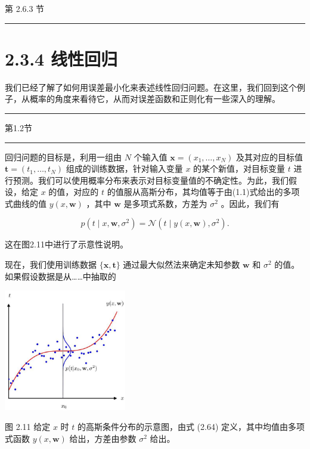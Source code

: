\documentclass[10pt]{report}
\newcommand{\HRule}{\begin{center}\rule{0.9\linewidth}{0.2mm}\end{center}}
\begin{document}
第 2.6.3 节

\HRule

\section*{2.3.4 线性回归}

我们已经了解了如何用误差最小化来表述线性回归问题。在这里，我们回到这个例子，从概率的角度来看待它，从而对误差函数和正则化有一些深入的理解。

\HRule

第1.2节

\HRule

回归问题的目标是，利用一组由 \(N\) 个输入值 \(\mathbf{x} = \left( {{x}_{1},\ldots ,{x}_{N}}\right)\) 及其对应的目标值 \(\mathbf{t} = \left( {{t}_{1},\ldots ,{t}_{N}}\right)\) 组成的训练数据，针对输入变量 \(x\) 的某个新值，对目标变量 \(t\) 进行预测。我们可以使用概率分布来表示对目标变量值的不确定性。为此，我们假设，给定 \(x\) 的值，对应的 \(t\) 的值服从高斯分布，其均值等于由(1.1)式给出的多项式曲线的值 \(y\left( {x,\mathbf{w}}\right)\) ，其中 \(\mathbf{w}\) 是多项式系数，方差为 \({\sigma }^{2}\) 。因此，我们有

\[
p\left( {t \mid  x,\mathbf{w},{\sigma }^{2}}\right)  = \mathcal{N}\left( {t \mid  y\left( {x,\mathbf{w}}\right) ,{\sigma }^{2}}\right) . \tag{2.64}
\]

这在图2.11中进行了示意性说明。

现在，我们使用训练数据 \(\{ \mathbf{x},\mathbf{t}\}\) 通过最大似然法来确定未知参数 \(\mathbf{w}\) 和 \({\sigma }^{2}\) 的值。如果假设数据是从……中抽取的

\begin{center}
\includegraphics[max width=0.4\textwidth]{images/0194e279-9b28-703a-88f4-c3ac21e2010d_60_942_345_607_604_0.jpg}
\end{center}
\hspace*{3em} 

图 2.11 给定 \(x\) 时 \(t\) 的高斯条件分布的示意图，由式 (2.64) 定义，其中均值由多项式函数 \(y\left( {x,\mathbf{w}}\right)\) 给出，方差由参数 \({\sigma }^{2}\) 给出。
\end{document}
